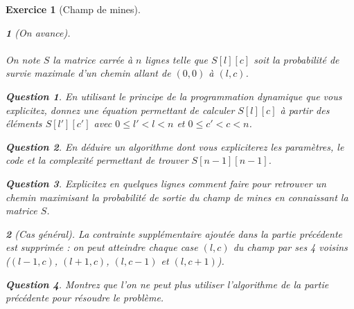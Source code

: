 \documentclass{article}
\theoremstyle{exostyle}
\newtheorem{exo}{Exercice}
\theoremstyle{partiestyle}
\newtheorem{partie}{}[exo]
\theoremstyle{questionstyle}
\newtheorem{questionpartie}{Question}[partie]
\begin{document}
\begin{exo}[Champ de mines]
\begin{partie}[On avance]
            \paragraph{}On note $S$ la matrice carrée à $n$ lignes telle que $S[l][c]$ soit la probabilité de survie maximale d'un chemin allant de $(0,0)$ à $(l, c)$. 
        \begin{questionpartie}
            En utilisant le principe de la programmation dynamique que vous explicitez, donnez une équation permettant de calculer $S[l][c]$ à partir des éléments $S[l'][c']$ avec $0 \leq l' < l < n$ et $0 \leq c' < c < n$.
        \end{questionpartie}
        \begin{questionpartie}
            En déduire un algorithme dont vous expliciterez les paramètres, le code et la complexité permettant de trouver $S[n-1][n-1]$.
        \end{questionpartie}
        \begin{questionpartie}
            Explicitez en quelques lignes comment faire pour retrouver un chemin maximisant la probabilité de sortie du champ de mines en connaissant la matrice $S$.
        \end{questionpartie}
    \end{partie}
    \begin{partie}[Cas général]
        La contrainte supplémentaire ajoutée dans la partie précédente est supprimée : on peut atteindre chaque case $(l, c)$ du champ par ses 4 voisins ($(l-1, c)$, $(l+1, c)$, $(l, c-1)$ et $(l, c+1)$).
        \begin{questionpartie}
      Montrez que l'on ne peut plus utiliser l'algorithme de la partie précédente pour résoudre le problème. 
        \end{questionpartie}


\end{partie}
\end{exo}
\end{document}
